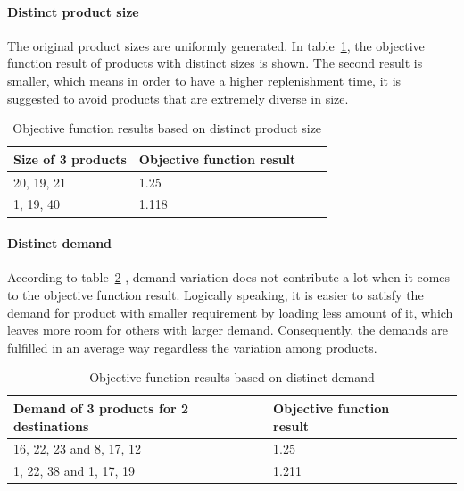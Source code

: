 \documentclass{article}
\begin{document}
\paragraph{Distinct product size}
The original product sizes are uniformly generated. In table~\ref{tab:size variation}, the objective function result of products with distinct sizes is shown. The second result is smaller, which means in order to have a higher replenishment time, it is suggested to avoid products that are extremely diverse in size.

\begin{table}[ht]
 \caption{Objective function results based on distinct product size}
  \centering
  \begin{tabular}{llll}
    \toprule
    Size of 3 products   & Objective function result \\
    \midrule
    20, 19, 21	&	1.25	\\
    1, 19, 40	&	1.118	\\
    \bottomrule
  \end{tabular}
  \label{tab:size variation}
\end{table}

\paragraph{Distinct demand}
According to table~\ref{tab:demand variation} , demand variation does not contribute a lot when it comes to the objective function result. Logically speaking, it is easier to satisfy the demand for product with smaller requirement by loading less amount of it, which leaves more room for others with larger demand. Consequently, the demands are fulfilled in an average way regardless the variation among products.

\begin{table}[ht]
 \caption{Objective function results based on distinct demand}
  \centering
  \begin{tabular}{llll}
    \toprule
    Demand of 3 products for 2 destinations   & Objective function result \\
    \midrule
    16, 22, 23 and 8, 17, 12	&	1.25	\\
    1, 22, 38 and 1, 17, 19	&	1.211	\\
    \bottomrule
  \end{tabular}
  \label{tab:demand variation}
\end{table}
\end{document}
